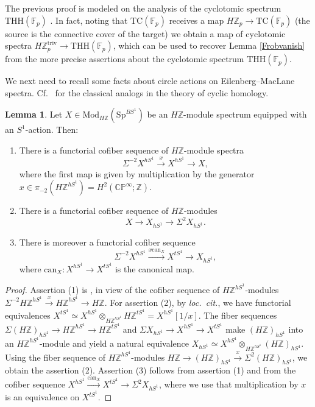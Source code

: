 \documentclass{amsart}
\newcommand{\THH}{\mathrm{THH}}
\newcommand{\md}{\mathrm{Mod}}
\newcommand{\Sp}{\mathrm{Sp}}
\theoremstyle{definition}
\newtheorem{lemma}[definition]{Lemma}
\newcommand{\To}{\longrightarrow}
\newcommand{\xto}{\xrightarrow}
\newcommand{\TC}{\mathrm{TC}}
\begin{document}
The previous proof is modeled on the analysis of the
cyclotomic spectrum $\THH(\mathbb{F}_p)$  \cite[Sec.~IV-4]{nikolaus-scholze}.
In fact, noting that $\TC(\mathbb{F}_p)$ receives a map $H\mathbb{Z}_p \to \TC(\mathbb{F}_p)$
(the source is the connective cover of the target)
we obtain a map of cyclotomic spectra $H \mathbb{Z}_p^{\mathrm{triv}} \to \THH(\mathbb{F}_p)$, which can be used to recover Lemma \ref{Frobvanish} from the more precise assertions about the cyclotomic spectrum $\THH(\mathbb{F}_p)$.


We next need to recall some facts about circle actions on
Eilenberg--MacLane spectra. 
Cf.~\cite[Sec.~2.2]{Loday} for the classical analogs in the theory of cyclic
homology. 
\begin{lemma} 
\label{cofiberofx}
Let $X \in \md_{H \mathbb{Z}}(\Sp^{BS^1})$ be an $H \mathbb{Z}$-module spectrum
equipped with an $S^1$-action. Then: 
\begin{enumerate}
\item  
There is a functorial cofiber sequence
of $H\mathbb{Z}$-module spectra
\[ \Sigma^{-2} X^{hS^1} \stackrel{x}{\To} X^{hS^1} \To X,  \]
where the first map is given by multiplication by the generator $x \in
\pi_{-2}(H \mathbb{Z}^{hS^1}) = H^2( \mathbb{CP}^\infty; \mathbb{Z})$. 
\item
\label{hS1cofib}
There is a functorial cofiber sequence of $H \mathbb{Z}$-modules
\[ X \to  X_{hS^1} \to \Sigma^2  X_{hS^1} . \]
\item There is moreover a functorial cofiber sequence
\[ \Sigma^{-2} X^{hS^1} \xto{x \mathrm{can}_X} X^{tS^1} \To
X_{hS^1},  \]
where $\mathrm{can}_X: X^{hS^1} \to X^{tS^1}$ is the canonical map. 

\end{enumerate}
 

\end{lemma} 
\begin{proof} 
Assertion (1) is \cite[Lemma~IV.4.12]{nikolaus-scholze}, in view
of the cofiber sequence 
of $H\mathbb{Z}^{hS^1}$-modules $\Sigma^{-2} H\mathbb{Z}^{hS^1}
\xrightarrow{x} H\mathbb{Z}^{hS^1} \to H\mathbb{Z}$. 
For assertion (2), by \emph{loc.~cit.}, we have
functorial equivalences $X^{tS^1} \simeq X^{hS^1} \otimes_{H\mathbb{Z}^{hS^1}}
H\mathbb{Z}^{tS^1} = X^{hS^1}[1/x]$. 
The fiber sequences 
$\Sigma (H\mathbb{Z})_{hS^1} \to H\mathbb{Z}^{hS^1} \to H\mathbb{Z}^{tS^1}$
and 
$\Sigma X_{hS^1} \to X^{hS^1} \to X^{tS^1}$
make 
$(H\mathbb{Z})_{hS^1}$ into an $H\mathbb{Z}^{hS^1} $-module and yield a
natural equivalence 
$X_{hS^1} \simeq X^{hS^1} \otimes_{H\mathbb{Z}^{hS^1}} (H\mathbb{Z})_{hS^1}$. 
Using the fiber sequence of $H\mathbb{Z}^{hS^1}$-modules $H\mathbb{Z} \to
(H\mathbb{Z})_{hS^1} \xrightarrow{x} \Sigma^2 (H \mathbb{Z})_{hS^1}$, we obtain
the assertion (2). 
Assertion (3) follows from assertion (1) and  from the cofiber sequence $X^{hS^1}
\stackrel{\mathrm{can}_X}{\to} X^{tS^1} \to \Sigma^2 X_{hS^1}$, where we use 
that multiplication by $x$ is an equivalence on $X^{tS^1}$. 
\end{proof}
\end{document}
